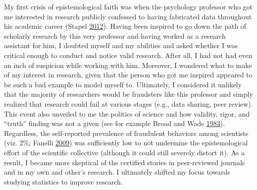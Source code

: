 \documentclass[a5paper]{book}
\begin{document}
My first crisis of epistemological faith was when the psychology
professor who got me interested in research publicly confessed to having
fabricated data throughout his academic career (Stapel
\protect\hyperlink{ref-isbn:9789044623123}{2012}). Having been inspired
to go down the path of scholarly research by this very professor and
having worked as a research assistant for him, I doubted myself and my
abilities and asked whether I was critical enough to conduct and notice
valid research. After all, I had not had even an inch of suspicion while
working with him. Moreover, I wondered what to make of my interest in
research, given that the person who got me inspired appeared to be such
a bad example to model myself to. Ultimately, I considered it unlikely
that the majority of researchers would be fraudsters like this professor
and simply realized that research could fail at various stages (e.g.,
data sharing, peer review). This event also unveiled to me the politics
of science and how validity, rigor, and \enquote{truth} finding was not
a given (see for example Broad and Wade
\protect\hyperlink{ref-isbn:9780671447694}{1983}). Regardless, the
self-reported prevalence of fraudulent behaviors among scientists (viz.
2\%; Fanelli
\protect\hyperlink{ref-doi:10.1371ux2fjournal.pone.0005738}{2009}) was
sufficiently low to not undermine the epistemological effort of the
scientific collective (although it could still severely distort it). As
a result, I became more skeptical of the certified stories in
peer-reviewed journals and in my own and other's research. I ultimately
shifted my focus towards studying statistics to improve research.
\end{document}
